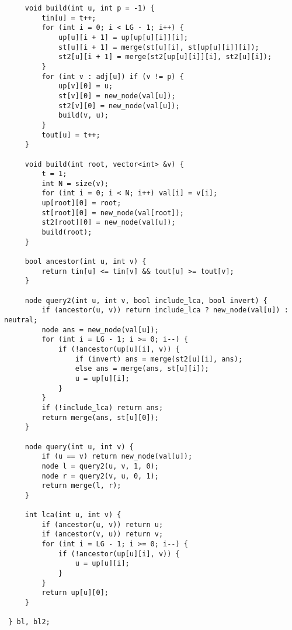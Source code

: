 \documentclass[11pt, a4paper, twoside]{article}
\begin{document}
\begin{lstlisting}
     void build(int u, int p = -1) {
         tin[u] = t++;
         for (int i = 0; i < LG - 1; i++) {
             up[u][i + 1] = up[up[u][i]][i];
             st[u][i + 1] = merge(st[u][i], st[up[u][i]][i]);
             st2[u][i + 1] = merge(st2[up[u][i]][i], st2[u][i]);
         }
         for (int v : adj[u]) if (v != p) {
             up[v][0] = u;
             st[v][0] = new_node(val[u]);
             st2[v][0] = new_node(val[u]);
             build(v, u);
         }
         tout[u] = t++;
     }
 
     void build(int root, vector<int> &v) {
         t = 1;
         int N = size(v);
         for (int i = 0; i < N; i++) val[i] = v[i];
         up[root][0] = root;
         st[root][0] = new_node(val[root]);
         st2[root][0] = new_node(val[u]);
         build(root);
     }
 
     bool ancestor(int u, int v) {
         return tin[u] <= tin[v] && tout[u] >= tout[v];
     }
 
     node query2(int u, int v, bool include_lca, bool invert) {
         if (ancestor(u, v)) return include_lca ? new_node(val[u]) : neutral;
         node ans = new_node(val[u]);
         for (int i = LG - 1; i >= 0; i--) {
             if (!ancestor(up[u][i], v)) {
                 if (invert) ans = merge(st2[u][i], ans);
                 else ans = merge(ans, st[u][i]);
                 u = up[u][i];
             }
         }
         if (!include_lca) return ans;
         return merge(ans, st[u][0]);
     }
 
     node query(int u, int v) { 
         if (u == v) return new_node(val[u]);
         node l = query2(u, v, 1, 0);
         node r = query2(v, u, 0, 1);
         return merge(l, r);
     }
 
     int lca(int u, int v) {
         if (ancestor(u, v)) return u;
         if (ancestor(v, u)) return v;
         for (int i = LG - 1; i >= 0; i--) {
             if (!ancestor(up[u][i], v)) {
                 u = up[u][i];
             }
         }
         return up[u][0];
     }
 
 } bl, bl2;
 
\end{lstlisting}
\end{document}
